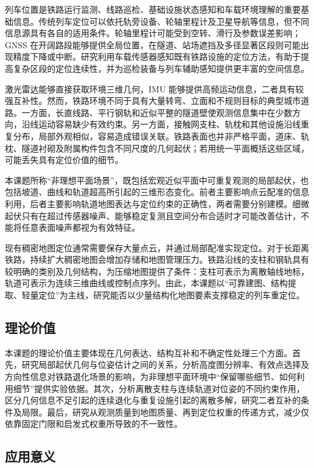\documentclass[UTF8,a4paper,12pt,fontset=fandol]{ctexart}
\begin{document}
列车位置是铁路运行监测、线路巡检、基础设施状态感知和车载环境理解的重要基础信息。传统列车定位可以依托轨旁设备、轮轴里程计及卫星导航等信息，但不同信息源具有各自的适用条件。轮轴里程计可能受到空转、滑行及参数误差影响；GNSS 在开阔路段能够提供全局位置，在隧道、站场遮挡及多径显著区段则可能出现精度下降或中断。研究利用车载传感器感知既有铁路设施的定位方法，有助于提高复杂区段的定位连续性，并为巡检装备与列车辅助感知提供更丰富的空间信息。

激光雷达能够直接获取环境三维几何，IMU 能够提供高频运动信息，二者具有较强互补性。然而，铁路环境不同于具有大量转弯、立面和不规则目标的典型城市道路。一方面，长直线路、平行钢轨和近似平整的隧道壁使观测信息集中在少数方向，沿线运动容易缺少有效约束。另一方面，接触网支柱、轨枕和其他设施沿线重复分布，局部外观相似，容易造成错误关联。铁路表面也并非严格平面，道床、轨枕、隧道衬砌及附属构件包含不同尺度的几何起伏；若用统一平面概括这些区域，可能丢失具有定位价值的细节。

本课题所称“非理想平面场景”，既包括宏观近似平面中可重复观测的局部起伏，也包括坡道、曲线和轨道超高所引起的三维形态变化。前者主要影响点云配准的信息利用，后者主要影响轨道地图表达与定位约束的正确性，两者需要分别建模。细微起伏只有在超过传感器噪声、能够稳定复测且空间分布合适时才可能改善估计，不能将任意表面噪声都视为有效特征。

现有稠密地图定位通常需要保存大量点云，并通过局部配准实现定位。对于长距离铁路，持续扩大稠密地图会增加存储和地图管理压力。铁路沿线的支柱和钢轨具有较明确的类别及几何结构，为压缩地图提供了条件：支柱可表示为离散轴线地标，轨道可表示为连续三维曲线或控制点序列。由此，本课题以“可靠建图、结构提取、轻量定位”为主线，研究能否以少量结构化地图要素支撑稳定的列车重定位。

\subsection{理论价值}

本课题的理论价值主要体现在几何表达、结构互补和不确定性处理三个方面。首先，研究局部起伏几何与位姿估计之间的关系，分析高度图分辨率、有效点选择及方向性信息对铁路退化场景的影响，为非理想平面环境中“保留哪些细节、如何利用细节”提供实验依据。其次，分析离散支柱与连续轨道对位姿的不同约束作用，区分几何信息不足引起的连续退化与重复设施引起的离散多解，研究二者互补的条件及局限。最后，研究从观测质量到地图质量、再到定位权重的传递方式，减少仅依靠固定门限和启发式权重所导致的不一致性。

\subsection{应用意义}
\end{document}
